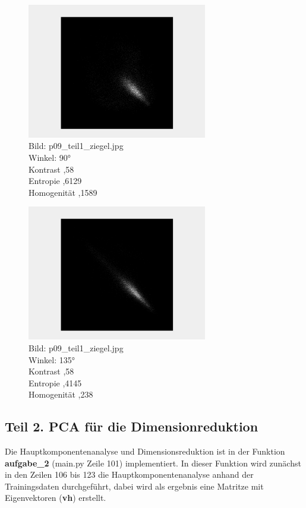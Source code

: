 \documentclass[12pt]{article}
\begin{document}
\begin{figure}[H]
  \centering
  \includegraphics[width=0.7\textwidth, keepaspectratio]{texture_b3.png}\\
  Bild: p09\_teil1\_ziegel.jpg\\
  Winkel: 90°\\
  Kontrast ,58\\
  Entropie ,6129\\
  Homogenität ,1589
\end{figure}
\begin{figure}[H]
  \centering
  \includegraphics[width=0.7\textwidth, keepaspectratio]{texture_b4.png}\\
  Bild: p09\_teil1\_ziegel.jpg\\
  Winkel: 135°\\
  Kontrast ,58\\
  Entropie ,4145\\
  Homogenität ,238
\end{figure}

\subsection*{Teil 2. PCA für die Dimensionreduktion}
Die Hauptkomponentenanalyse und Dimensionsreduktion ist in der Funktion \textbf{aufgabe\_2} (main.py Zeile 101) implementiert.
In dieser Funktion wird zunächst in den Zeilen 106 bis 123 die Hauptkomponentenanalyse anhand der Trainingsdaten durchgeführt, dabei wird als ergebnis eine Matritze mit Eigenvektoren (\textbf{vh}) erstellt.
\end{document}
